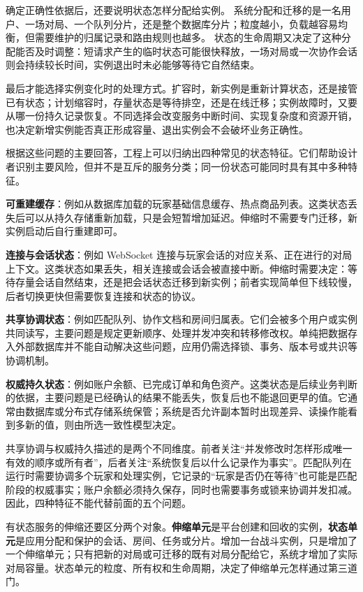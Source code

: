 确定正确性依据后，还要说明状态怎样分配给实例。
系统分配和迁移的是一名用户、一场对局、一个队列分片，还是整个数据库分片；粒度越小，负载越容易均衡，但需要维护的归属记录和路由规则也越多。
状态的生命周期又决定了这种分配能否及时调整：短请求产生的临时状态可能很快释放，一场对局或一次协作会话则会持续较长时间，实例退出时未必能够等待它自然结束。

最后才能选择实例变化时的处理方式。扩容时，新实例是重新计算状态，还是接管已有状态；计划缩容时，存量状态是等待排空，还是在线迁移；实例故障时，又要从哪一份持久记录恢复。不同选择会改变服务中断时间、实现复杂度和资源开销，也决定新增实例能否真正形成容量、退出实例会不会破坏业务正确性。

根据这些问题的主要回答，工程上可以归纳出四种常见的状态特征。它们帮助设计者识别主要风险，但并不是互斥的服务分类；同一份状态可能同时具有其中多种特征。

\textbf{可重建缓存}：例如从数据库加载的玩家基础信息缓存、热点商品列表。这类状态丢失后可以从持久存储重新加载，只是会短暂增加延迟。伸缩时不需要专门迁移，新实例启动后自行重建即可。

\textbf{连接与会话状态}：例如 WebSocket 连接与玩家会话的对应关系、正在进行的对局上下文。这类状态如果丢失，相关连接或会话会被直接中断。伸缩时需要决定：等待存量会话自然结束，还是把会话状态迁移到新实例；前者实现简单但下线较慢，后者切换更快但需要恢复连接和状态的协议。

\textbf{共享协调状态}：例如匹配队列、协作文档和房间归属表。它们会被多个用户或实例共同读写，主要问题是规定更新顺序、处理并发冲突和转移修改权。单纯把数据存入外部数据库并不能自动解决这些问题，应用仍需选择锁、事务、版本号或共识等协调机制。

\textbf{权威持久状态}：例如账户余额、已完成订单和角色资产。这类状态是后续业务判断的依据，主要问题是已经确认的结果不能丢失，恢复后也不能退回更早的值。它通常由数据库或分布式存储系统保管；系统是否允许副本暂时出现差异、读操作能看到多新的值，则由所选一致性模型决定。

共享协调与权威持久描述的是两个不同维度。前者关注“并发修改时怎样形成唯一有效的顺序或所有者”，后者关注“系统恢复后以什么记录作为事实”。匹配队列在运行时需要协调多个玩家和处理实例，它记录的“玩家是否仍在等待”也可能是匹配阶段的权威事实；账户余额必须持久保存，同时也需要事务或锁来协调并发扣减。因此，四种特征不能代替前面的五个问题。

有状态服务的伸缩还要区分两个对象。\textbf{伸缩单元}是平台创建和回收的实例，\textbf{状态单元}是应用分配和保护的会话、房间、任务或分片。增加一台战斗实例，只是增加了一个伸缩单元；只有把新的对局或可迁移的既有对局分配给它，系统才增加了实际对局容量。状态单元的粒度、所有权和生命周期，决定了伸缩单元怎样通过第三道门。

